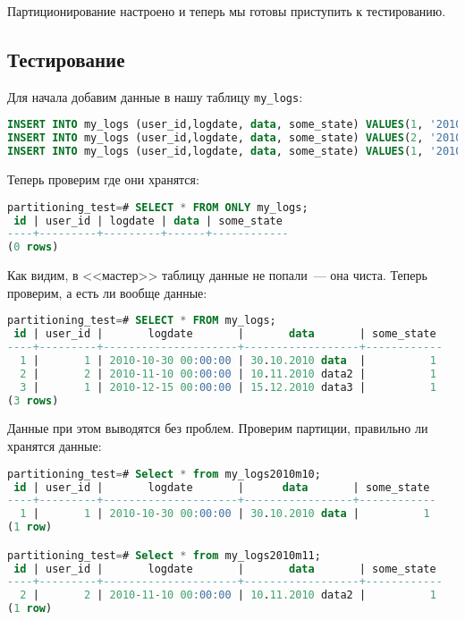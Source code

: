 Партиционирование настроено и теперь мы готовы приступить к тестированию.

\subsection{Тестирование}

Для начала добавим данные в нашу таблицу \lstinline!my_logs!:

\begin{lstlisting}[language=SQL,label=lst:partitioning7,caption=Данные]
INSERT INTO my_logs (user_id,logdate, data, some_state) VALUES(1, '2010-10-30', '30.10.2010 data', 1);
INSERT INTO my_logs (user_id,logdate, data, some_state) VALUES(2, '2010-11-10', '10.11.2010 data2', 1);
INSERT INTO my_logs (user_id,logdate, data, some_state) VALUES(1, '2010-12-15', '15.12.2010 data3', 1);
\end{lstlisting}

Теперь проверим где они хранятся:

\begin{lstlisting}[language=SQL,label=lst:partitioning8,caption=<<Мастер>> таблица чиста]
partitioning_test=# SELECT * FROM ONLY my_logs;
 id | user_id | logdate | data | some_state
----+---------+---------+------+------------
(0 rows)
\end{lstlisting}

Как видим, в <<мастер>> таблицу данные не попали~--- она чиста. Теперь проверим, а есть ли вообще данные:

\begin{lstlisting}[language=SQL,label=lst:partitioning9,caption=Проверка данных]
partitioning_test=# SELECT * FROM my_logs;
 id | user_id |       logdate       |       data       | some_state
----+---------+---------------------+------------------+------------
  1 |       1 | 2010-10-30 00:00:00 | 30.10.2010 data  |          1
  2 |       2 | 2010-11-10 00:00:00 | 10.11.2010 data2 |          1
  3 |       1 | 2010-12-15 00:00:00 | 15.12.2010 data3 |          1
(3 rows)
\end{lstlisting}

Данные при этом выводятся без проблем. Проверим партиции, правильно ли хранятся данные:

\begin{lstlisting}[language=SQL,label=lst:partitioning10,caption=Проверка хранения данных]
partitioning_test=# Select * from my_logs2010m10;
 id | user_id |       logdate       |      data       | some_state
----+---------+---------------------+-----------------+------------
  1 |       1 | 2010-10-30 00:00:00 | 30.10.2010 data |          1
(1 row)

partitioning_test=# Select * from my_logs2010m11;
 id | user_id |       logdate       |       data       | some_state
----+---------+---------------------+------------------+------------
  2 |       2 | 2010-11-10 00:00:00 | 10.11.2010 data2 |          1
(1 row)
\end{lstlisting}

